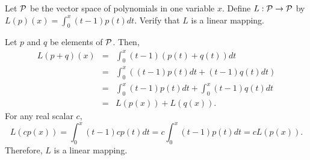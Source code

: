 \documentclass{ximera}
\begin{document}
\begin{exercise} \label{c7.2.6}
Let ${\cal P}$ be the vector space of polynomials in one variable
$x$.  Define $L:{\cal P}\to {\cal P}$ by $L(p)(x)=\int_0^x(t-1)p(t)dt$.
Verify that $L$ is a linear mapping.

\begin{solution}

Let $p$ and $q$ be elements of ${\cal P}$.  Then,
\[ \begin{array}{rcl}
L(p + q)(x) & = & \int_0^x(t - 1)(p(t) + q(t))dt \\
& = & \int_0^x((t - 1)p(t)dt + (t - 1)q(t)dt) \\
& = & \int_0^x(t - 1)p(t)dt + \int_0^x(t - 1)q(t)dt \\
& = & L(p(x)) + L(q(x)). \end{array} \]
For any real scalar $c$,
\[ L(cp(x)) = \int_0^x(t - 1)cp(t)dt = c\int_0^x(t - 1)p(t)dt
= cL(p(x)). \]
Therefore, $L$ is a linear mapping.





\end{solution}
\end{exercise}
\end{document}
